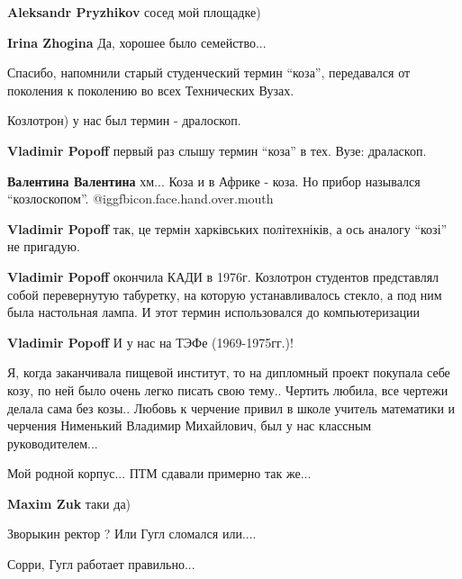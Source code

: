 \begin{itemize}
\begin{itemize} %
\textbf{Aleksandr Pryzhikov} сосед мой площадке)

\textbf{Irina Zhogina} Да, хорошее было семейство...
\end{itemize} %


Спасибо, напомнили старый студенческий термин \enquote{коза}, передавался от
поколения к поколению во всех Технических Вузах.

Козлотрон) у нас был термин - дралоскоп.

\begin{itemize} %
\textbf{Vladimir Popoff} первый раз слышу термин \enquote{коза} в тех. Вузе: драласкоп.

\textbf{Валентина Валентина} хм... Коза и в Африке - коза. Но прибор назывался \enquote{козлоскопом}. @igg{fbicon.face.hand.over.mouth} 

\textbf{Vladimir Popoff} так, це термін харківських політехніків, а ось аналогу \enquote{козі} не пригадую.

\textbf{Vladimir Popoff} окончила КАДИ в 1976г. Козлотрон студентов представлял собой перевернутую табуретку, на которую устанавливалось стекло, а под ним была настольная лампа. И этот термин использовался до компьютеризации

\textbf{Vladimir Popoff} И у нас на ТЭФе (1969-1975гг.)!
\end{itemize} %


Я, когда заканчивала пищевой институт, то на дипломный проект покупала себе
козу, по ней было очень легко писать свою тему.. Чертить любила, все чертежи
делала сама без козы.. Любовь к черчение привил в школе учитель математики и
черчения Нименький Владимир Михайлович, был у нас классным руководителем...

Мой родной корпус... ПТМ сдавали примерно так же...

\begin{itemize} %
\textbf{Maxim Zuk} таки да)
\end{itemize} %

Зворыкин ректор ? Или Гугл сломался или....

Сорри, Гугл работает правильно...


\end{itemize}
